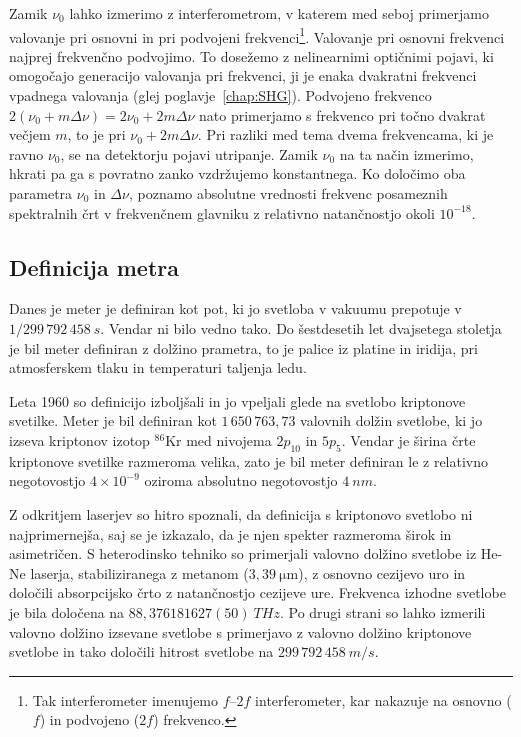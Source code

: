 Zamik $\nu_0$ lahko izmerimo
z interferometrom, v katerem med seboj primerjamo valovanje pri 
osnovni in pri podvojeni frekvenci\footnote{Tak interferometer imenujemo $f$--$2f$
interferometer, kar nakazuje na osnovno ($f$)  in podvojeno ($2f$) frekvenco.}.
Valovanje pri osnovni frekvenci najprej frekvenčno podvojimo. To dosežemo 
z nelinearnimi optičnimi pojavi, ki omogočajo generacijo valovanja pri frekvenci, 
ji je enaka dvakratni frekvenci vpadnega valovanja 
(glej poglavje~\ref{chap:SHG}). Podvojeno frekvenco $2(\nu_0 + 
m\Delta \nu)= 2\nu_0 + 2m\Delta \nu$ nato primerjamo s frekvenco pri 
točno dvakrat večjem $m$, to je pri $\nu_0 + 2m\Delta \nu$. Pri razliki med tema
dvema frekvencama, ki je ravno $\nu_0$, se na detektorju pojavi utripanje.
Zamik $\nu_0$ na ta način izmerimo, hkrati pa ga s povratno zanko
vzdržujemo konstantnega. Ko določimo oba parametra $\nu_0$ in $\Delta \nu$, 
poznamo absolutne vrednosti frekvenc posameznih spektralnih črt v frekvenčnem 
glavniku z relativno natančnostjo okoli $10^{-18}$.

\subsection*{Definicija metra}
Danes je meter je definiran kot pot, ki jo svetloba v vakuumu prepotuje v 
$1/299\,792\, 458~\si{s}$.  Vendar ni bilo vedno tako. Do šestdesetih let dvajsetega
stoletja je bil meter definiran z dolžino prametra, to je palice iz platine in iridija, 
pri atmosferskem tlaku in temperaturi taljenja ledu. 

Leta 1960 so definicijo 
izboljšali in jo vpeljali glede na svetlobo kriptonove svetilke. Meter je bil 
definiran kot $1\,650\, 763,73$ valovnih dolžin svetlobe, ki jo izseva kriptonov
izotop $^{86}$Kr med nivojema $2p_{10}$ in $5p_5$. Vendar je širina črte
kriptonove svetilke razmeroma velika, zato je bil meter 
definiran le z relativno negotovostjo $4 \times 10^{-9}$ oziroma absolutno 
negotovostjo $4~\si{nm}$. 

Z odkritjem laserjev so hitro spoznali, da definicija s kriptonovo svetlobo ni 
najprimernejša, saj se je izkazalo, da je njen spekter razmeroma širok in asimetričen. 
S heterodinsko tehniko so primerjali valovno dolžino 
svetlobe 
iz He-Ne laserja, stabiliziranega z metanom ($3,39~\si{\micro\meter}$), z osnovno
cezijevo uro in določili absorpcijsko črto z natančnostjo cezijeve ure.
Frekvenca izhodne svetlobe je bila določena na $88,376181627(50)~\si{THz}$.
Po drugi strani so lahko izmerili valovno dolžino izsevane svetlobe s primerjavo 
z valovno dolžino kriptonove svetlobe in tako določili hitrost svetlobe na
$299\, 792\, 458~\si{m/s}$.

